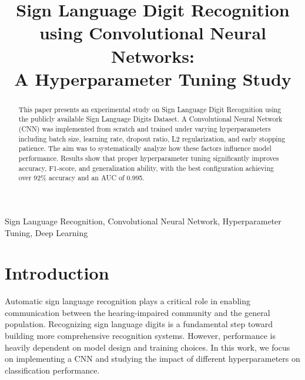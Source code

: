 \documentclass[conference]{IEEEtran}
\begin{document}
    

\title{Sign Language Digit Recognition using Convolutional Neural Networks: \\ 
A Hyperparameter Tuning Study}

\author{
}

\maketitle

\begin{abstract}
This paper presents an experimental study on Sign Language Digit Recognition using the publicly available Sign Language Digits Dataset. A Convolutional Neural Network (CNN) was implemented from scratch and trained under varying hyperparameters including batch size, learning rate, dropout ratio, L2 regularization, and early stopping patience. The aim was to systematically analyze how these factors influence model performance. Results show that proper hyperparameter tuning significantly improves accuracy, F1-score, and generalization ability, with the best configuration achieving over 92\% accuracy and an AUC of 0.995.
\end{abstract}

\begin{IEEEkeywords}
Sign Language Recognition, Convolutional Neural Network, Hyperparameter Tuning, Deep Learning
\end{IEEEkeywords}

\section{Introduction}
Automatic sign language recognition plays a critical role in enabling communication between the hearing-impaired community and the general population. Recognizing sign language digits is a fundamental step toward building more comprehensive recognition systems. However, performance is heavily dependent on model design and training choices. In this work, we focus on implementing a CNN and studying the impact of different hyperparameters on classification performance.
\end{document}
